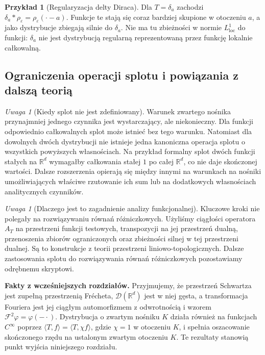 \documentclass[11pt,a4paper]{article}
\numberwithin{equation}{section}
\theoremstyle{plain}
\theoremstyle{definition}
\newtheorem{przyklad}[twierdzenie]{Przykład}
\theoremstyle{remark}
\newtheorem{uwaga}[twierdzenie]{Uwaga}
\newcommand{\R}{\mathbb R}
\begin{document}
\begin{przyklad}[Regularyzacja delty Diraca]
\label{ex:delta-smooth21}
Dla $T=\delta_a$ zachodzi
$\delta_a*\rho_\varepsilon=\rho_\varepsilon(\cdot-a)$.
Funkcje te stają się coraz bardziej skupione
w otoczeniu $a$, a jako dystrybucje zbiegają
silnie do $\delta_a$. Nie ma tu zbieżności w
normie $L^1_{\mathrm{loc}}$ do funkcji:
$\delta_a$ nie jest dystrybucją regularną
reprezentowaną przez funkcję lokalnie całkowalną.
\end{przyklad}

\subsection{Ograniczenia operacji splotu i powiązania z dalszą teorią}

\begin{uwaga}[Kiedy splot nie jest zdefiniowany]
\label{rem:convolution-limits21}
Warunek zwartego nośnika przynajmniej jednego
czynnika jest wystarczający, ale niekonieczny.
Dla funkcji odpowiednio całkowalnych splot może istnieć
bez tego warunku. Natomiast dla dowolnych dwóch
dystrybucji nie istnieje jedna kanoniczna operacja
splotu o wszystkich powyższych własnościach.
Na przykład formalny splot dwóch funkcji stałych
na $\R^d$ wymagałby całkowania stałej $1$
po całej $\R^d$, co nie daje skończonej wartości.
Dalsze rozszerzenia opierają się między innymi
na warunkach na nośniki umożliwiających właściwe
rzutowanie ich sum lub na dodatkowych własnościach
analitycznych czynników.
\end{uwaga}

\begin{uwaga}[Dlaczego jest to zagadnienie analizy funkcjonalnej]
\label{rem:convolution-tvs21}
Kluczowe kroki nie polegały na rozwiązywaniu równań
różniczkowych. Użyliśmy ciągłości operatora
$A_T$ na przestrzeni funkcji testowych, transpozycji
na jej przestrzeń dualną, przenoszenia zbiorów ograniczonych
oraz zbieżności silnej w tej przestrzeni dualnej.
Są to konstrukcje z teorii przestrzeni liniowo-topologicznych.
Dalsze zastosowania splotu do rozwiązywania równań
różniczkowych pozostawiamy odrębnemu skryptowi.
\end{uwaga}


\setcounter{section}{21}
\noindent\textbf{Fakty z wcześniejszych rozdziałów.}
Przyjmujemy, że przestrzeń Schwartza jest zupełną przestrzenią Frécheta,
$\mathcal D(\R^d)$ jest w niej gęsta, a transformacja Fouriera
jest jej ciągłym automorfizmem z odwrotnością i wzorem
$\mathcal F^2\varphi=\varphi(-\cdot)$.
Dystrybucja o zwartym nośniku $K$ działa również na funkcjach
$C^\infty$ poprzez $\langle T,f\rangle=\langle T,\chi f\rangle$,
gdzie $\chi=1$ w otoczeniu $K$, i spełnia oszacowanie
skończonego rzędu na ustalonym zwartym otoczeniu $K$.
Te rezultaty stanowią punkt wyjścia niniejszego rozdziału.
\end{document}
